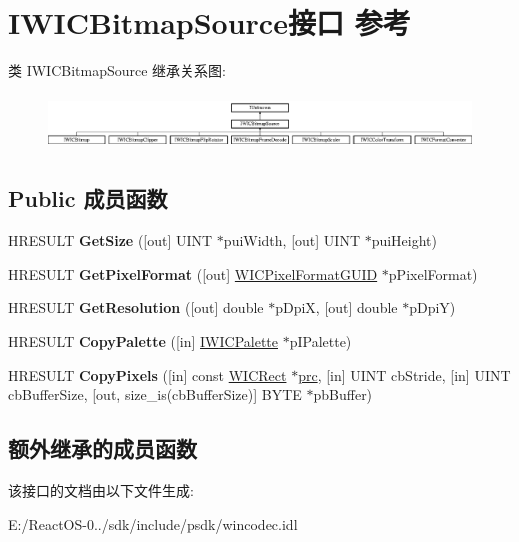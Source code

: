 \hypertarget{interface_i_w_i_c_bitmap_source}{}\section{I\+W\+I\+C\+Bitmap\+Source接口 参考}
\label{interface_i_w_i_c_bitmap_source}
类 I\+W\+I\+C\+Bitmap\+Source 继承关系图\+:\begin{figure}[H]
\begin{center}
\leavevmode
\includegraphics[height=1.472393cm]{interface_i_w_i_c_bitmap_source}
\end{center}
\end{figure}
\subsection*{Public 成员函数}
\begin{DoxyCompactItemize}
\item 
\mbox{\label{interface_i_w_i_c_bitmap_source_ad5a6652151d72860483f035048348555}} 
H\+R\+E\+S\+U\+LT {\bfseries Get\+Size} (\mbox{[}out\mbox{]} U\+I\+NT $\ast$pui\+Width, \mbox{[}out\mbox{]} U\+I\+NT $\ast$pui\+Height)
\item 
\mbox{\label{interface_i_w_i_c_bitmap_source_abc9b1e860af52e9c3124d61f60e2b1af}} 
H\+R\+E\+S\+U\+LT {\bfseries Get\+Pixel\+Format} (\mbox{[}out\mbox{]} \hyperlink{interface_g_u_i_d}{W\+I\+C\+Pixel\+Format\+G\+U\+ID} $\ast$p\+Pixel\+Format)
\item 
\mbox{\label{interface_i_w_i_c_bitmap_source_afe4bb7a9987d2ecd5eef65e32de8fd66}} 
H\+R\+E\+S\+U\+LT {\bfseries Get\+Resolution} (\mbox{[}out\mbox{]} double $\ast$p\+DpiX, \mbox{[}out\mbox{]} double $\ast$p\+DpiY)
\item 
\mbox{\label{interface_i_w_i_c_bitmap_source_a73a43bcee4d756dfded9e1e19da41490}} 
H\+R\+E\+S\+U\+LT {\bfseries Copy\+Palette} (\mbox{[}in\mbox{]} \hyperlink{interface_i_w_i_c_palette}{I\+W\+I\+C\+Palette} $\ast$p\+I\+Palette)
\item 
\mbox{\label{interface_i_w_i_c_bitmap_source_a5692b0646517d0fe3025657f4ce56a87}} 
H\+R\+E\+S\+U\+LT {\bfseries Copy\+Pixels} (\mbox{[}in\mbox{]} const \hyperlink{struct_w_i_c_rect}{W\+I\+C\+Rect} $\ast$\hyperlink{structtag_r_e_c_t}{prc}, \mbox{[}in\mbox{]} U\+I\+NT cb\+Stride, \mbox{[}in\mbox{]} U\+I\+NT cb\+Buffer\+Size, \mbox{[}out, size\+\_\+is(cb\+Buffer\+Size)\mbox{]} B\+Y\+TE $\ast$pb\+Buffer)
\end{DoxyCompactItemize}
\subsection*{额外继承的成员函数}


该接口的文档由以下文件生成\+:\begin{DoxyCompactItemize}
\item 
E\+:/\+React\+O\+S-\/0../sdk/include/psdk/wincodec.\+idl\end{DoxyCompactItemize}
